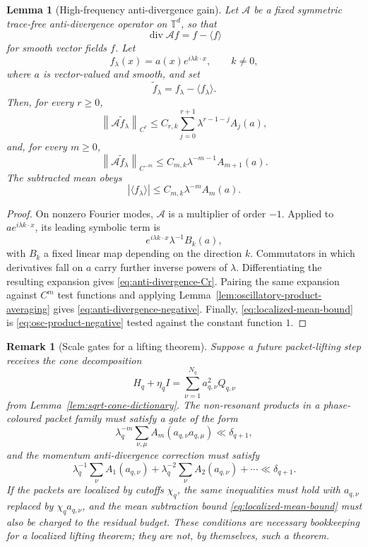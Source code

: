 \documentclass[11pt]{article}
\numberwithin{equation}{section}
\newtheorem{lemma}[theorem]{Lemma}
\newtheorem{remark}[theorem]{Remark}
\newcommand{\norm}[1]{\left\lVert #1\right\rVert}
\begin{document}
\begin{lemma}[High-frequency anti-divergence gain]
\label{lem:anti-divergence-gain}
Let \(\mathcal A\) be a fixed symmetric trace-free anti-divergence operator on
\(\mathbb T^d\), so that
\[
  \operatorname{div}\mathcal A f=f-\langle f\rangle
\]
for smooth vector fields \(f\).  Let
\[
  f_\lambda(x)=a(x)e^{i\lambda k\cdot x},
  \qquad k\ne0,
\]
where \(a\) is vector-valued and smooth, and set
\[
  \widetilde f_\lambda=f_\lambda-\langle f_\lambda\rangle .
\]
Then, for every \(r\ge0\),
\begin{equation}
  \norm{\mathcal A\widetilde f_\lambda}_{C^r}
  \le
  C_{r,k}\sum_{j=0}^{r+1}
  \lambda^{r-1-j}A_j(a),
  \label{eq:anti-divergence-Cr}
\end{equation}
and, for every \(m\ge0\),
\begin{equation}
  \norm{\mathcal A\widetilde f_\lambda}_{C^{-m}}
  \le C_{m,k}\lambda^{-m-1}A_{m+1}(a).
  \label{eq:anti-divergence-negative}
\end{equation}
The subtracted mean obeys
\begin{equation}
  |\langle f_\lambda\rangle|
  \le C_{m,k}\lambda^{-m}A_m(a).
  \label{eq:localized-mean-bound}
\end{equation}
\end{lemma}

\begin{proof}
On nonzero Fourier modes, \(\mathcal A\) is a multiplier of order \(-1\).
Applied to \(a e^{i\lambda k\cdot x}\), its leading symbolic term is
\[
  e^{i\lambda k\cdot x}\lambda^{-1}B_k(a),
\]
with \(B_k\) a fixed linear map depending on the direction \(k\).  Commutators
in which derivatives fall on \(a\) carry further inverse powers of \(\lambda\).
Differentiating the resulting expansion gives
\eqref{eq:anti-divergence-Cr}.  Pairing the same expansion against \(C^m\)
test functions and applying Lemma~\ref{lem:oscillatory-product-averaging}
gives \eqref{eq:anti-divergence-negative}.  Finally,
\eqref{eq:localized-mean-bound} is \eqref{eq:osc-product-negative} tested
against the constant function \(1\).
\end{proof}

\begin{remark}[Scale gates for a lifting theorem]
\label{rem:packet-scale-gates}
Suppose a future packet-lifting step receives the cone decomposition
\[
  H_q+\eta_q I=\sum_{\nu=1}^{N_q}a_{q,\nu}^2Q_{q,\nu}
\]
from Lemma~\ref{lem:sqrt-cone-dictionary}.  The non-resonant products in a
phase-coloured packet family must satisfy a gate of the form
\[
  \lambda_q^{-m}
  \sum_{\nu,\mu}A_m(a_{q,\nu}a_{q,\mu})
  \ll \delta_{q+1},
\]
and the momentum anti-divergence correction must satisfy
\[
  \lambda_q^{-1}\sum_\nu A_1(a_{q,\nu})
  +\lambda_q^{-2}\sum_\nu A_2(a_{q,\nu})
  +\cdots
  \ll \delta_{q+1}.
\]
If the packets are localized by cutoffs \(\chi_q\), the same inequalities must
hold with \(a_{q,\nu}\) replaced by \(\chi_q a_{q,\nu}\), and the mean
subtraction bound \eqref{eq:localized-mean-bound} must also be charged to the
residual budget.  These conditions are necessary bookkeeping for a localized
lifting theorem; they are not, by themselves, such a theorem.
\end{remark}
\end{document}

